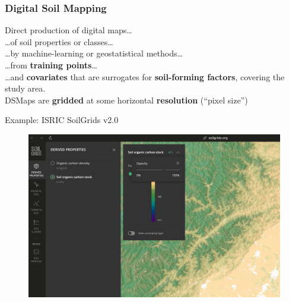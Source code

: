 \documentclass[aspectratio=169]{beamer}
\begin{document}
\begin{frame}
\frametitle{Digital Soil Mapping}

Direct production of digital maps\ldots\\
\ldots of soil properties or classes\ldots\\
\ldots by machine-learning or geostatistical methods\ldots\\
\ldots from \textbf{training points}\ldots\\
\ldots and \textbf{covariates} that are surrogates for \textbf{soil-forming factors}, covering the study area.
\\[2ex]
DSMaps are \textbf{gridded} at some horizontal \textbf{resolution} (``pixel size'')
\end{frame}

\begin{frame}{Example: ISRIC SoilGrids v2.0}
\begin{figure}
    \centering
\includegraphics[height=0.8\textheight]{./graphics_david/SoilGrids_SOCstock_Chengdu.png}
\end{figure}
\end{frame}
\end{document}
